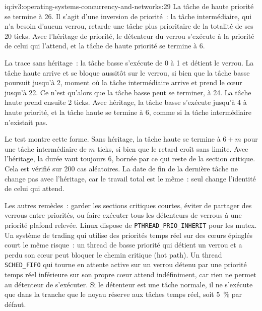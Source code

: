 \begin{solution}{iq:iv3:operating-systems-concurrency-and-networks:29}
La tâche de haute priorité se termine à 26. Il s'agit d'une inversion de priorité~: la tâche intermédiaire, qui n'a besoin d'aucun verrou, retarde une tâche plus prioritaire de la totalité de ses 20 ticks. Avec l'héritage de priorité, le détenteur du verrou s'exécute à la priorité de celui qui l'attend, et la tâche de haute priorité se termine à 6.
\label{lst:iv3:os:inversion}

La trace sans héritage~: la tâche basse s'exécute de 0 à 1 et détient le verrou. La tâche haute arrive et se bloque aussitôt sur le verrou, si bien que la tâche basse poursuit jusqu'à 2, moment où la tâche intermédiaire arrive et prend le cœur jusqu'à 22. Ce n'est qu'alors que la tâche basse peut se terminer, à 24. La tâche haute prend ensuite 2 ticks. Avec héritage, la tâche basse s'exécute jusqu'à 4 à haute priorité, et la tâche haute se termine à 6, comme si la tâche intermédiaire n'existait pas.

Le test montre cette forme. Sans héritage, la tâche haute se termine à $6 + m$ pour une tâche intermédiaire de $m$ ticks, si bien que le retard croît sans limite. Avec l'héritage, la durée vaut toujours 6, bornée par ce qui reste de la section critique. Cela est vérifié sur 200 cas aléatoires. La date de fin de la dernière tâche ne change pas avec l'héritage, car le travail total est le même~: seul change l'identité de celui qui attend.

Les autres remèdes~: garder les sections critiques courtes, éviter de partager des verrous entre priorités, ou faire exécuter tous les détenteurs de verrous à une priorité plafond relevée. Linux dispose de \texttt{PTHREAD\_PRIO\_INHERIT} pour les mutex. Un système de trading qui utilise des priorités temps réel sur des cœurs épinglés court le même risque~: un thread de basse priorité qui détient un verrou et a perdu son cœur peut bloquer le chemin critique (hot path). Un thread \texttt{SCHED\_FIFO} qui tourne en attente active sur un verrou détenu par une priorité temps réel inférieure sur son propre cœur attend indéfiniment, car rien ne permet au détenteur de s'exécuter. Si le détenteur est une tâche normale, il ne s'exécute que dans la tranche que le noyau réserve aux tâches temps réel, soit 5~\% par défaut.

\end{solution}

